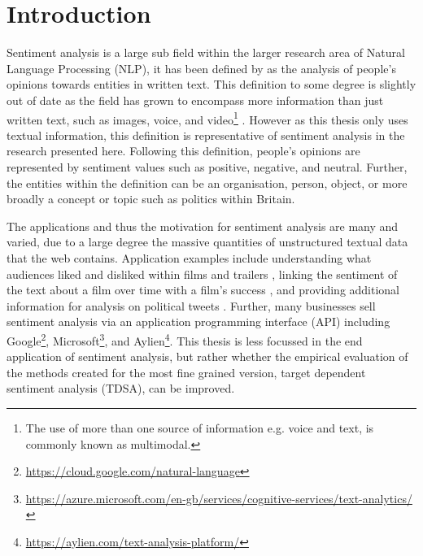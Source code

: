 \section{Introduction}
Sentiment analysis is a large sub field within the larger research area of Natural Language Processing (NLP), it has been defined by \citet{liu2015sentiment} as the analysis of people's opinions towards entities in written text. This definition to some degree is slightly out of date as the field has grown to encompass more information than just written text, such as images, voice, and video\footnote{The use of more than one source of information e.g. voice and text, is commonly known as multimodal.} \citep{poria2016fusing}. However as this thesis only uses textual information, this definition is representative of sentiment analysis in the research presented here. Following this definition, people's opinions are represented by sentiment values such as positive, negative, and neutral. Further, the entities within the definition can be an organisation, person, object, or more broadly a concept or topic such as politics within Britain. 


The applications and thus the motivation for sentiment analysis are many and varied, due to a large degree the massive quantities of unstructured textual data that the web contains. Application examples include understanding what audiences liked and disliked within films and trailers \citep{pereg-etal-2019-absapp}, linking the sentiment of the text about a film over time with a film's success \citep{Vecchio2018TheDS}, and providing additional information for analysis on political tweets \citep{wang-etal-2017-totemss}. Further, many businesses sell sentiment analysis via an application programming interface (API) including Google\footnote{\url{https://cloud.google.com/natural-language}}, Microsoft\footnote{\url{https://azure.microsoft.com/en-gb/services/cognitive-services/text-analytics/}}, and Aylien\footnote{\url{https://aylien.com/text-analysis-platform/}}. This thesis is less focussed in the end application of sentiment analysis, but rather whether the empirical evaluation of the methods created for the most fine grained version, target dependent sentiment analysis (TDSA), can be improved.


